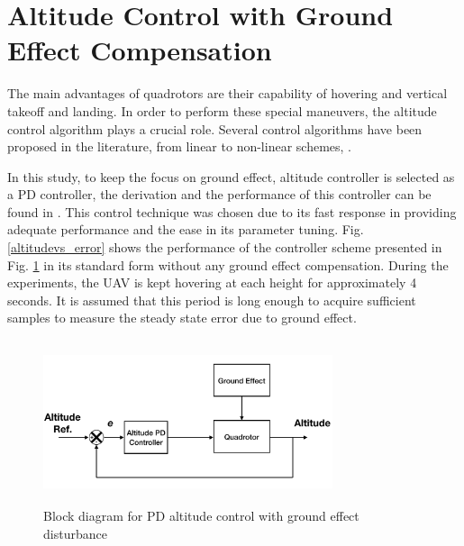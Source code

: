 \documentclass[twocolumn,10pt]{asme2ej}
\begin{document}
\section{Altitude Control with Ground Effect Compensation} \label{exp_resutls}
The main advantages of quadrotors are their capability of hovering and vertical takeoff and landing. In order to perform these special maneuvers, the altitude control algorithm plays a crucial role. Several control algorithms have been proposed in the literature, from linear to non-linear schemes, \cite{Wicaksono2017, Abci2017, Carrillo2012, Lee2012}.

In this study, to keep the focus on ground effect, altitude controller is selected as a PD controller, the derivation and the performance of this controller can be found in \cite{DenaRuiz2017}. This control technique was chosen due to its fast response in providing adequate performance and the ease in its parameter tuning. Fig. \ref{altitudevs_error} shows the performance of the controller scheme presented in Fig. \ref{pd_ge_comp} in its standard form without any ground effect compensation. During the experiments, the UAV is kept hovering at each height for approximately 4 seconds. It is assumed that this period is long enough to acquire sufficient samples to measure the steady state error due to ground effect.

\begin{figure}[t]
  \begin{center}
  \setlength{\unitlength}{0.012500in}%
  \includegraphics[width=8.5cm, height=4.8cm]{Images/control_block_diag.png}
  \end{center}
  \caption{Block diagram for PD altitude control with ground effect disturbance}
  \label{pd_ge_comp}
\end{figure}
\end{document}
